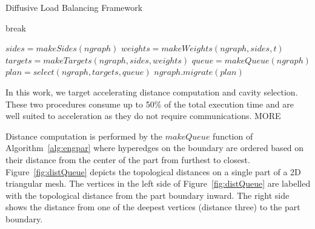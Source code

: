 \documentclass[graybox]{svmult}
\begin{document}
\begin{algorithm}[H]
  \caption{Diffusive Load Balancing Framework}
  \label{alg:engpar}
  \small
  \begin{algorithmic}[1]
    \State break
    \EndIf
    \EndWhile
    \EndFor
    \EndProcedure

    \State $sides = makeSides(ngraph)$
    \State $weights = makeWeights(ngraph,sides,t)$
    \State $targets = makeTargets(ngraph,sides,weights)$
    \State $queue = makeQueue(ngraph)$
    \State $plan = select(ngraph,targets,queue)$
    \State $ngraph.migrate(plan)$
    \EndProcedure
  \end{algorithmic}
\end{algorithm}

In this work, we target accelerating distance computation and cavity selection.
These two procedures consume up to 50\% of the total execution time and are well
suited to acceleration as they do not require communications.
MORE

Distance computation is performed by the $makeQueue$ function of
Algorithm~\ref{alg:engpar} where hyperedges on the boundary are ordered based on
their distance from the center of the part from furthest to closest.
Figure~\ref{fig:distQueue} depicts the topological distances on a single part of
a 2D triangular mesh.
The vertices in the left side of Figure~\ref{fig:distQueue} are labelled with
the topological distance from the part boundary inward.
The right side shows the distance from one of the deepest vertices (distance
three) to the part boundary.
\end{document}
